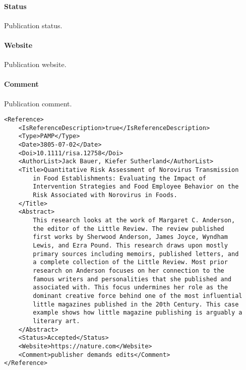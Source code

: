 \documentclass[a4paper]{report}
\begin{document}
\paragraph{Status}
Publication status.

\paragraph{Website}
Publication website.

\paragraph{Comment}
Publication comment.

\begin{lstlisting}[basicstyle=\footnotesize, caption={Example of Reference}]
<Reference>
    <IsReferenceDescription>true</IsReferenceDescription>
    <Type>PAMP</Type>
    <Date>3805-07-02</Date>
    <Doi>10.1111/risa.12758</Doi>
    <AuthorList>Jack Bauer, Kiefer Sutherland</AuthorList>
    <Title>Quantitative Risk Assessment of Norovirus Transmission
        in Food Establishments: Evaluating the Impact of
        Intervention Strategies and Food Employee Behavior on the
        Risk Associated with Norovirus in Foods.
    </Title>
    <Abstract>
        This research looks at the work of Margaret C. Anderson,
        the editor of the Little Review. The review published
        first works by Sherwood Anderson, James Joyce, Wyndham
        Lewis, and Ezra Pound. This research draws upon mostly
        primary sources including memoirs, published letters, and
        a complete collection of the Little Review. Most prior
        research on Anderson focuses on her connection to the
        famous writers and personalities that she published and
        associated with. This focus undermines her role as the
        dominant creative force behind one of the most influential
        little magazines published in the 20th Century. This case
        example shows how little magazine publishing is arguably a
        literary art.
    </Abstract>
    <Status>Accepted</Status>
    <Website>https://nature.com</Website>
    <Comment>publisher demands edits</Comment>
</Reference>
\end{lstlisting}    

\end{document}
